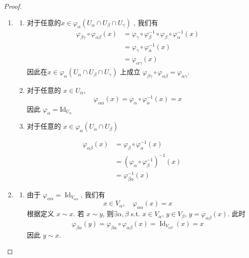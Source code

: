 \documentclass[../main.tex]{subfiles}
\begin{document}
\begin{proof}
 \begin{enumerate}
    \item \begin{enumerate}
        \item 对于任意的\( x\in  \varphi _{\alpha }\left( U_{\alpha }\cap U_{\beta }\cap U_{ \gamma } \right)   \) , 我们有 \[
        \begin{aligned}
         \varphi _{\beta  \gamma }\circ  \varphi _{\alpha \beta }\left( x \right) &=   \varphi _{ \gamma }\circ  \varphi _{\beta }^{-1} \circ  \varphi _{\beta }\circ  \varphi _{\alpha }^{-1}  \left( x \right)\\ 
          &=  \varphi _{ \gamma }\circ  \varphi _{\alpha }^{-1} \left( x \right)\\ 
           &=   \varphi _{\alpha  \gamma }\left( x \right)   
        \end{aligned}
        \]因此在\( x\in  \varphi _{\alpha }\left( U_{\alpha }\cap U_{\beta }\cap U_{ \gamma } \right)   \) 上成立 \(   \varphi _{\beta  \gamma }\circ  \varphi _{\alpha \beta }=  \varphi _{\alpha  \gamma }  \).
        \item 对于任意的 \(  x \in U_{\alpha }  \), \[
         \varphi _{\alpha \alpha }\left( x \right) =  \varphi _{\alpha }\circ  \varphi _{\alpha }^{-1} \left( x \right) = x
        \]    因此 \(   \varphi _{\alpha }= \mathrm{Id}_{U_{\alpha }}  \) 
        \item 对于任意的 \( x\in  \varphi _{\alpha }\left( U_{\alpha }\cap U_{\beta }\right)   \) 
    \end{enumerate}
    \[
    \begin{aligned}
     \varphi _{\alpha \beta }\left( x \right)&=  \varphi _{\beta }\circ  \varphi _{\alpha }^{-1} \left( x \right)\\ 
      &= \left(  \varphi  _{\alpha }\circ  \varphi _{\beta }^{-1}  \right)^{-1} \left( x \right)\\ 
       &=       \varphi _{\beta  \alpha }^{-1} \left( x \right) 
    \end{aligned}
    \]
    \item \begin{enumerate}
        \item 由于 \(   \varphi _{ \alpha  \alpha }= \operatorname{Id}_{V_{\alpha  \alpha }}  \), 我们有  \[
        x\in V_{\alpha },\quad  \varphi _{\alpha  \alpha }\left( x \right) = x
        \]根据定义 \(  x\sim x  \).
        若 \(  x\sim y  \), 则\(  \exists \alpha ,\beta   \) s.t. \(  x\in V_{\alpha }  \), \(  y \in V_{\beta }  \), \(  y=  \varphi _{\alpha \beta }\left( x \right)   \). 此时 \[
         \varphi _{\beta \alpha }\left( y \right)=  \varphi _{\beta \alpha }\circ \varphi _{\alpha \beta }\left( x \right)= \operatorname{Id}_{V_{\alpha \beta }}\left( x \right)= x   
        \]      因此 \(  y \sim x  \).
        

\end{enumerate}
\end{enumerate}
\end{proof}
\end{document}
